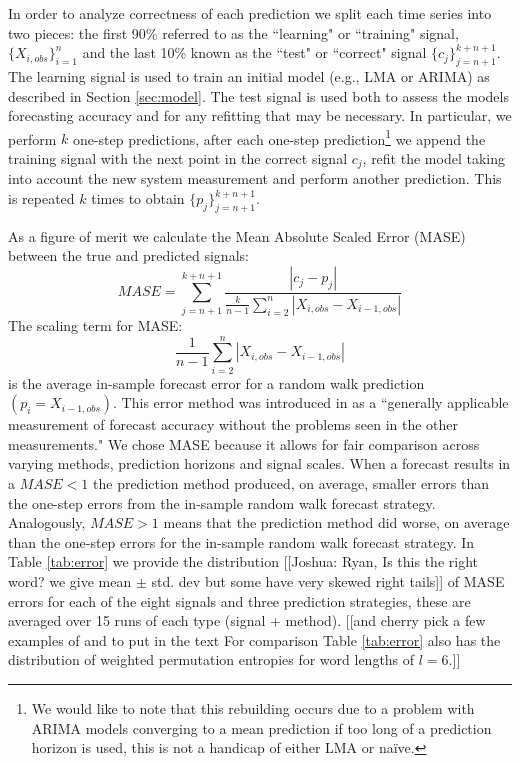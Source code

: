 In order to analyze correctness of each prediction we split each time series into two pieces: the first 90\% referred to as the ``learning" or ``training" signal, $\{X_{i,obs}\}_{i=1}^{n}$ and the last 10\% known as the ``test" or ``correct" signal $\{c_j\}_{j=n+1}^{k+n+1}$. The learning signal is used to train an initial model (e.g., LMA or ARIMA) as described in Section \ref{sec:model}. The test signal is used both to assess the models forecasting accuracy and for any refitting that may be necessary. In particular, we perform $k$ one-step predictions, after each one-step prediction\footnote{We would like to note that this rebuilding occurs due to a problem with ARIMA models converging to a mean prediction if too long of a prediction horizon is used, this is not a handicap of either LMA or na\"ive.} we append the training signal with the next point in the correct signal $c_j$, refit the model taking into account the new system measurement and perform another prediction. This is repeated $k$ times to obtain $\{p_j\}_{j=n+1}^{k+n+1}$.

As a figure of merit we calculate the Mean Absolute Scaled Error (MASE)\cite{MASE} between the true and predicted signals: 
$$MASE = \sum_{j=n+1}^{k+n+1}\frac{|c_j-p_j| }{\frac{k}{n-1}\sum^n_{i=2}|X_{i,obs}-X_{i-1,obs}|}$$
The scaling term for MASE:
$$\frac{1}{n-1}\sum^n_{i=2}|X_{i,obs}-X_{i-1,obs}|$$ 
is the average in-sample forecast error for a random walk prediction $(p_i=X_{i-1,obs})$. This error method was introduced in \cite{MASE} as a ``generally applicable measurement of forecast accuracy without the problems seen in the other measurements." We chose MASE because it allows for fair comparison across varying methods, prediction horizons and signal scales. When a forecast results in a $MASE<1$ the prediction method produced, on average, smaller errors than the one-step errors from the in-sample random walk forecast strategy. Analogously, $MASE>1$ means that the prediction method did worse, on average than the one-step errors for the in-sample random walk forecast strategy. In Table \ref{tab:error} we provide the distribution {\color{red}[[Joshua: Ryan, Is this the right word? we give mean $\pm$ std. dev but some have very skewed right tails]]}  of MASE errors for each of the eight signals and three prediction strategies, these are averaged over 15 runs of each type (signal + method). [[and cherry pick a few examples of \gcc and \col to put in the text For comparison Table \ref{tab:error} also has the distribution of weighted permutation entropies for word lengths of $l=6$.]]


